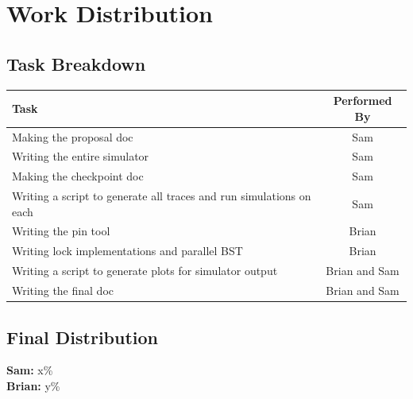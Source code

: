 \documentclass{article}
\begin{document}

\section{Work Distribution}

\subsection{Task Breakdown}
\begin{table}[H]
    \centering
    \renewcommand{\arraystretch}{1.5}
    \begin{tabular}{| p{.5\linewidth} | c |}
        \hline
        \textbf{Task} & \textbf{Performed By} \\
        \hline \hline
        Making the proposal doc & Sam \\
        \hline
        Writing the entire simulator & Sam \\
        \hline
        Making the checkpoint doc & Sam \\
        \hline
        Writing a script to generate all traces and run simulations on each & Sam \\
        \hline
        Writing the pin tool & Brian \\
        \hline
        Writing lock implementations and parallel BST & Brian \\
        \hline
        Writing a script to generate plots for simulator output & Brian and Sam \\
        \hline
        Writing the final doc & Brian and Sam \\
        \hline
    \end{tabular}
\end{table}

\subsection{Final Distribution}
\textbf{Sam: } x\% \\
\textbf{Brian: } y\%
\end{document}
